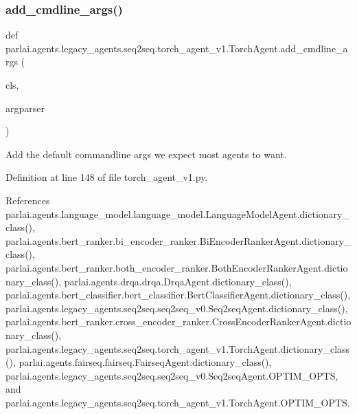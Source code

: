 \mbox{\label{classparlai_1_1agents_1_1legacy__agents_1_1seq2seq_1_1torch__agent__v1_1_1TorchAgent_a00701a40d62943dbd887525bf8e8002d}} 
\subsubsection{\texorpdfstring{add\+\_\+cmdline\+\_\+args()}{add\_cmdline\_args()}}
{\footnotesize\ttfamily def parlai.\+agents.\+legacy\+\_\+agents.\+seq2seq.\+torch\+\_\+agent\+\_\+v1.\+Torch\+Agent.\+add\+\_\+cmdline\+\_\+args (\begin{DoxyParamCaption}\item[{}]{cls,  }\item[{}]{argparser }\end{DoxyParamCaption})}

\begin{DoxyVerb}Add the default commandline args we expect most agents to want.\end{DoxyVerb}
 

Definition at line 148 of file torch\+\_\+agent\+\_\+v1.\+py.



References parlai.\+agents.\+language\+\_\+model.\+language\+\_\+model.\+Language\+Model\+Agent.\+dictionary\+\_\+class(), parlai.\+agents.\+bert\+\_\+ranker.\+bi\+\_\+encoder\+\_\+ranker.\+Bi\+Encoder\+Ranker\+Agent.\+dictionary\+\_\+class(), parlai.\+agents.\+bert\+\_\+ranker.\+both\+\_\+encoder\+\_\+ranker.\+Both\+Encoder\+Ranker\+Agent.\+dictionary\+\_\+class(), parlai.\+agents.\+drqa.\+drqa.\+Drqa\+Agent.\+dictionary\+\_\+class(), parlai.\+agents.\+bert\+\_\+classifier.\+bert\+\_\+classifier.\+Bert\+Classifier\+Agent.\+dictionary\+\_\+class(), parlai.\+agents.\+legacy\+\_\+agents.\+seq2seq.\+seq2seq\+\_\+v0.\+Seq2seq\+Agent.\+dictionary\+\_\+class(), parlai.\+agents.\+bert\+\_\+ranker.\+cross\+\_\+encoder\+\_\+ranker.\+Cross\+Encoder\+Ranker\+Agent.\+dictionary\+\_\+class(), parlai.\+agents.\+legacy\+\_\+agents.\+seq2seq.\+torch\+\_\+agent\+\_\+v1.\+Torch\+Agent.\+dictionary\+\_\+class(), parlai.\+agents.\+fairseq.\+fairseq.\+Fairseq\+Agent.\+dictionary\+\_\+class(), parlai.\+agents.\+legacy\+\_\+agents.\+seq2seq.\+seq2seq\+\_\+v0.\+Seq2seq\+Agent.\+O\+P\+T\+I\+M\+\_\+\+O\+P\+TS, and parlai.\+agents.\+legacy\+\_\+agents.\+seq2seq.\+torch\+\_\+agent\+\_\+v1.\+Torch\+Agent.\+O\+P\+T\+I\+M\+\_\+\+O\+P\+TS.

